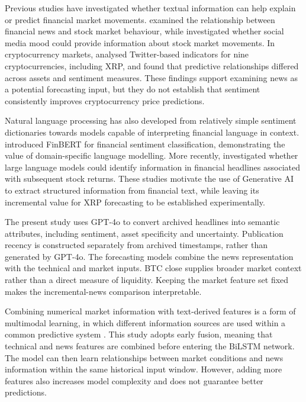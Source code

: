 Previous studies have investigated whether textual information can help explain or predict financial market movements. \citet{Tetlock2007} examined the relationship between financial news and stock market behaviour, while \citet{Bollen2011} investigated whether social media mood could provide information about stock market movements. In cryptocurrency markets, \citet{Kraaijeveld2020} analysed Twitter-based indicators for nine cryptocurrencies, including XRP, and found that predictive relationships differed across assets and sentiment measures. These findings support examining news as a potential forecasting input, but they do not establish that sentiment consistently improves cryptocurrency price predictions.

Natural language processing has also developed from relatively simple sentiment dictionaries towards models capable of interpreting financial language in context. \citet{Araci2019} introduced FinBERT for financial sentiment classification, demonstrating the value of domain-specific language modelling. More recently, \citet{LopezLira2023} investigated whether large language models could identify information in financial headlines associated with subsequent stock returns. These studies motivate the use of Generative AI to extract structured information from financial text, while leaving its incremental value for XRP forecasting to be established experimentally.

The present study uses GPT-4o to convert archived headlines into semantic attributes, including sentiment, asset specificity and uncertainty. Publication recency is constructed separately from archived timestamps, rather than generated by GPT-4o. The forecasting models combine the news representation with the technical and market inputs. BTC close supplies broader market context rather than a direct measure of liquidity. Keeping the market feature set fixed makes the incremental-news comparison interpretable.

Combining numerical market information with text-derived features is a form of multimodal learning, in which different information sources are used within a common predictive system \citep{Baltrusaitis2019}. This study adopts early fusion, meaning that technical and news features are combined before entering the BiLSTM network. The model can then learn relationships between market conditions and news information within the same historical input window. However, adding more features also increases model complexity and does not guarantee better predictions.

